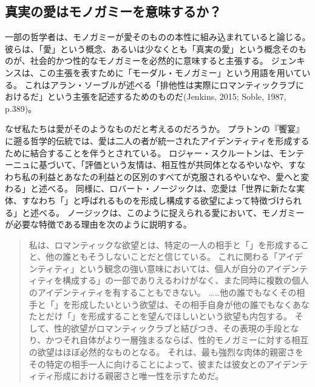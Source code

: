 \documentclass[paper=a4,book,openany]{jlreq} \usepackage{mystyle}
\begin{document}
\subsection{真実の愛はモノガミーを意味するか？}

一部の哲学者は、モノガミーが愛そのものの本性に組み込まれていると論じる。
彼らは、「愛」という概念、あるいは少なくとも「真実の愛」という概念そのものが、社会的かつ性的なモノガミーを必然的に意味すると主張する\citep{mckeever17:_is_requir_sexual_exclus_consis_roman_love}。
ジェンキンスは、この主張を表すために「モーダル・モノガミー」という用語を用いている。
これはアラン・ソーブルが述べる「排他性は実際にロマンティックラブにおけるだ」という主張を記述するためのものだ(Jenkins, 2015; Soble, 1987, p.389)。
\nocite{jenkins15:_modal_monog}\nocite{soble87:_unity_roman_love}

なぜ私たちは愛がそのようなものだと考えるのだろうか。
プラトンの『饗宴』に遡る哲学的伝統では、愛は二人の者が統一されたアイデンティティを形成するために結合することを伴うとされている。
ロジャー・スクルートンは、モンテーニュに基づいて、「評価という友情は、相互性が共同体となるやいなや、すなわち私の利益とあなたの利益との区別のすべてが克服されるやいなや、愛へと変わる」と述べる。
同様に、ロバート・ノージックは、恋愛は「世界に新たな実体、すなわち「」と呼ばれるものを形成し構成する欲望によって特徴づけられる」と述べる\citep[p.230]{scruton06:_sexual_desir}。
ノージックは、このように捉えられる愛において、モノガミーが必要な特徴である理由を次のように説明する。

\begin{quote}
私は、ロマンティックな欲望とは、特定の一人の相手と「」を形成すること、他の誰ともそうしないことだと信じている。
これに関わる「アイデンティティ」という観念の強い意味においては、個人が自分のアイデンティティを構成する」の一部でありえるわけがなく、また同時に複数の個人のアイデンティティを有することもできない。
……他の誰でもなくその相手と「」を形成したいという欲望は、その相手自身が他の誰でもなくあなたとだけ「」を形成することを望んでほしいという欲望も内包する。
そして、性的欲望がロマンティックラブと結びつき、その表現の手段となり、かつそれ自体がより一層強まるならば、性的モノガミーに対する相互の欲望はほぼ必然的なものとなる。
それは、最も強烈な肉体的親密さをその特定の相手一人に向けることによって、彼または彼女とのアイデンティティ形成における親密さと唯一性を示すためだ。
\citep[p.89]{nozick89:_examined_life}
\end{quote}
\end{document}
